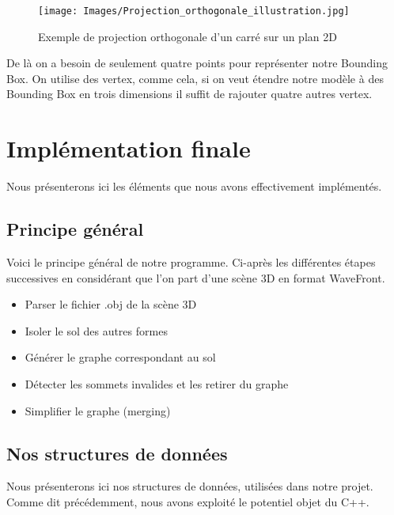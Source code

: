 \documentclass[a4paper,12pt]{report}
\begin{document}
\begin{figure}[h]
\centering
\texttt{[image: Images/Projection\_orthogonale\_illustration.jpg]}
\caption{Exemple de projection orthogonale d'un carré sur un plan 2D}
\label{nbintersect}
\end{figure}
\vspace{0.5cm}


De là on a besoin de seulement quatre points pour représenter notre Bounding Box. On utilise des vertex, comme cela, si on veut étendre notre modèle à des Bounding Box en trois dimensions il suffit de rajouter quatre autres vertex.

\chapter{Implémentation finale}

Nous présenterons ici les éléments que nous avons effectivement implémentés.

\section{Principe général}

Voici le principe général de notre programme. Ci-après les différentes étapes successives en considérant que l'on part d'une scène 3D en format WaveFront.

\begin{itemize}
 \item Parser le fichier .obj de la scène 3D
 \item Isoler le sol des autres formes
 \item Générer le graphe correspondant au sol
 \item Détecter les sommets invalides et les retirer du graphe
 \item Simplifier le graphe (merging)
\end{itemize}

\section{Nos structures de données}

Nous présenterons ici nos structures de données, utilisées dans notre projet. Comme dit précédemment, nous avons exploité le potentiel objet du C++.
\end{document}
